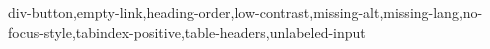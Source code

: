 div-button,empty-link,heading-order,low-contrast,missing-alt,missing-lang,no-focus-style,tabindex-positive,table-headers,unlabeled-input
